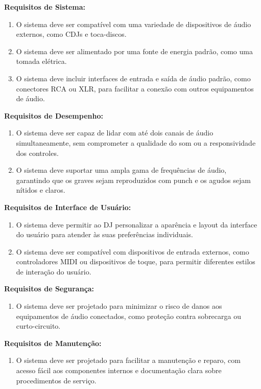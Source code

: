 \textbf{Requisitos de Sistema:}
\begin{enumerate}[label=\textbullet]
\item O sistema deve ser compatível com uma variedade de dispositivos de áudio externos, como CDJs e toca-discos.
\item O sistema deve ser alimentado por uma fonte de energia padrão, como uma tomada elétrica.
\item O sistema deve incluir interfaces de entrada e saída de áudio padrão, como conectores RCA ou XLR, para facilitar a conexão com outros equipamentos de áudio.
\end{enumerate}

\textbf{Requisitos de Desempenho:}
\begin{enumerate}[label=\textbullet]
\item O sistema deve ser capaz de lidar com até dois canais de áudio simultaneamente, sem comprometer a qualidade do som ou a responsividade dos controles.
\item O sistema deve suportar uma ampla gama de frequências de áudio, garantindo que os graves sejam reproduzidos com punch e os agudos sejam nítidos e claros.
\end{enumerate}

\textbf{Requisitos de Interface de Usuário:}
\begin{enumerate}[label=\textbullet]
\item O sistema deve permitir ao DJ personalizar a aparência e layout da interface do usuário para atender às suas preferências individuais.
\item O sistema deve ser compatível com dispositivos de entrada externos, como controladores MIDI ou dispositivos de toque, para permitir diferentes estilos de interação do usuário.
\end{enumerate}

\textbf{Requisitos de Segurança:}
\begin{enumerate}[label=\textbullet]
\item O sistema deve ser projetado para minimizar o risco de danos aos equipamentos de áudio conectados, como proteção contra sobrecarga ou curto-circuito.
\end{enumerate}

\textbf{Requisitos de Manutenção:}
\begin{enumerate}[label=\textbullet]
\item O sistema deve ser projetado para facilitar a manutenção e reparo, com acesso fácil aos componentes internos e documentação clara sobre procedimentos de serviço.
\end{enumerate}

